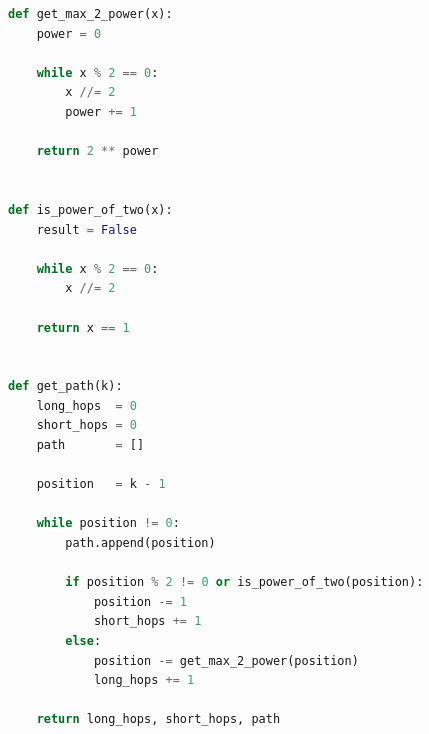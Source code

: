 \documentclass[12pt, a4paper]{extarticle}
\begin{document}
\begin{lstlisting}[language=python]
def get_max_2_power(x):
    power = 0
    
    while x % 2 == 0:
        x //= 2
        power += 1
        
    return 2 ** power


def is_power_of_two(x):
    result = False
    
    while x % 2 == 0:
        x //= 2
    
    return x == 1
    
    
def get_path(k):
    long_hops  = 0
    short_hops = 0
    path       = []
    
    position   = k - 1
    
    while position != 0:
        path.append(position)
    
        if position % 2 != 0 or is_power_of_two(position):
            position -= 1
            short_hops += 1
        else:
            position -= get_max_2_power(position)
            long_hops += 1
    
    return long_hops, short_hops, path
\end{lstlisting}
\end{document}
